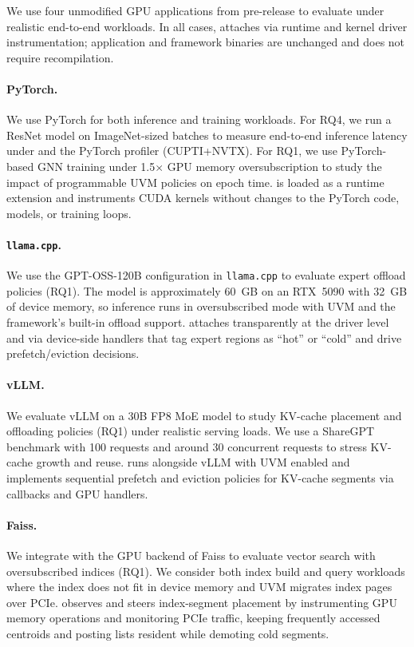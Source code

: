 We use four unmodified GPU applications from pre-release to evaluate \sys under realistic
end-to-end workloads. In all cases, \sys attaches via runtime and kernel driver
instrumentation; application and framework binaries are unchanged and does not require recompilation.

\paragraph{PyTorch.}
We use PyTorch for both inference and training workloads. For RQ4, we run a ResNet model on ImageNet-sized batches to measure end-to-end inference latency under \sys and the PyTorch profiler (CUPTI+NVTX). For RQ1, we use PyTorch-based GNN training under 1.5$\times$ GPU memory oversubscription to study the impact of programmable UVM policies on epoch time. \sys is loaded as a runtime extension and instruments CUDA kernels without changes to the PyTorch code, models, or training loops.

\paragraph{\texttt{llama.cpp}.}
We use the GPT-OSS-120B configuration in \texttt{llama.cpp} to evaluate expert offload policies (RQ1). The model is approximately 60~GB on an RTX~5090 with 32~GB of device memory, so inference runs in oversubscribed mode with UVM and the framework's built-in offload support. \sys attaches transparently at the driver level and via device-side handlers that tag expert regions as ``hot'' or ``cold'' and drive prefetch/eviction decisions.

\paragraph{vLLM.}
We evaluate vLLM on a 30B FP8 MoE model to study KV-cache placement and offloading policies (RQ1) under realistic serving loads. We use a ShareGPT benchmark with 100 requests and around 30 concurrent requests to stress KV-cache growth and reuse. \sys runs alongside vLLM with UVM enabled and implements sequential prefetch and eviction policies for KV-cache segments via callbacks and GPU handlers.

\paragraph{Faiss.}
We integrate \sys with the GPU backend of Faiss to evaluate vector search with oversubscribed indices (RQ1). We consider both index build and query workloads where the index does not fit in device memory and UVM migrates index pages over PCIe. \sys observes and steers index-segment placement by instrumenting GPU memory operations and monitoring PCIe traffic, keeping frequently accessed centroids and posting lists resident while demoting cold segments.


